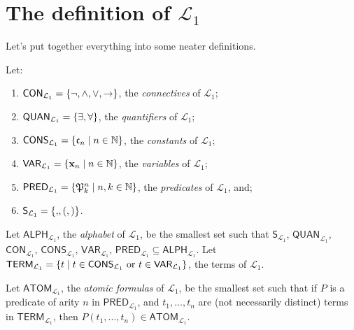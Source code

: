 \section{The definition of $\mathcal{L}_1$}

Let's put together everything into some neater definitions. 

\begin{defn} \label{language1}
Let:
	\begin{enumerate}
		\item $\mathsf{CON}_{\mathcal{L}_1}=\{\neg, \wedge, \vee, \rightarrow\}$, the \textit{connectives} of $\mathcal{L}_1$;
		\item $\mathsf{QUAN}_{\mathcal{L}_1}=\{\exists, \forall\}$, the \textit{quantifiers} of $\mathcal{L}_1$;
		\item $\mathsf{CONS}_{\mathcal{L}_1}=\{\mathfrak{c}_{n} \mid n \in \mathbb{N}\}$, the \textit{constants} of $\mathcal{L}_1$;
		\item $\mathsf{VAR}_{\mathcal{L}_1}=\{\mathbf{x}_{n} \mid n \in \mathbb{N}\}$, the \textit{variables} of $\mathcal{L}_1$;
		\item $\mathsf{PRED}_{\mathcal{L}_1}=\{\mathfrak{P}^{n}_{k} \mid n, k \in \mathbb{N}\}$, the \textit{predicates} of $\mathcal{L}_1$, and;
		\item $\mathsf{S}_{\mathcal{L}_1}=\{\mathsf{,} , (, )\}$.
	\end{enumerate}
Let $\mathsf{ALPH}_{\mathcal{L}_1}$, the \textit{alphabet} of $\mathcal{L}_1$, be the smallest set such that $\mathsf{S}_{\mathcal{L}_1}$, $\mathsf{QUAN}_{\mathcal{L}_1}$, $\mathsf{CON}_{\mathcal{L}_1}$, $\mathsf{CONS}_{\mathcal{L}_1}$, $\mathsf{VAR}_{\mathcal{L}_1}$, $\mathsf{PRED}_{\mathcal{L}_1} \subseteq \mathsf{ALPH}_{\mathcal{L}_1}$. Let $\textsf{TERM}_{\mathcal{L}_1}=\{t \mid t \in \mathsf{CONS}_{\mathcal{L}_1}\text{ or } t\in\mathsf{VAR}_{\mathcal{L}_1}\}$, the terms of $\mathcal{L}_1$.

Let $\mathsf{ATOM}_{\mathcal{L}_1}$, the \textit{atomic formulas} of $\mathcal{L}_1$, be the smallest set such that if $P$ is a predicate of arity $n$ in $\mathsf{PRED}_{\mathcal{L}_1}$, and $t_1, ..., t_n$ are (not necessarily distinct) terms in $\mathsf{TERM}_{\mathcal{L}_1}$, then $P(t_1, ..., t_n) \in \mathsf{ATOM}_{\mathcal{L}_1}$. 
	

\end{defn}
